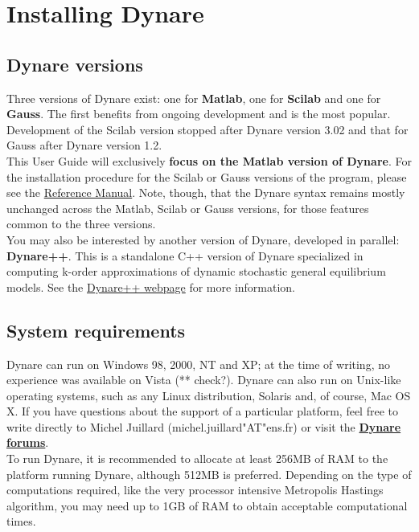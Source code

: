 \chapter{Installing Dynare} \label{ch:inst}

\section{Dynare versions}
Three versions of Dynare exist: one for \textbf{Matlab}, one for \textbf{Scilab} and one for \textbf{Gauss}. The first benefits from ongoing development and is the most popular. Development of the Scilab version stopped after Dynare version 3.02 and that for Gauss after Dynare version 1.2. \\

This User Guide will exclusively \textbf{focus on the Matlab version of Dynare}. For the installation procedure for the Scilab or Gauss versions of the program, please see the \href{http://www.cepremap.cnrs.fr/juillard/mambo/index.php?option=com_content&task=view&id=51&Itemid=84}{Reference Manual}. Note, though, that the Dynare syntax remains mostly unchanged across the Matlab, Scilab or Gauss versions, for those features common to the three versions. \\

You may also be interested by another version of Dynare, developed in parallel: \textbf{Dynare++}. This is a standalone C++ version of Dynare specialized in computing k-order approximations of dynamic stochastic general equilibrium models. See the \href{http://www.cepremap.cnrs.fr/juillard/mambo/index.php?option=com_content&task=view&id=53&Itemid=86}{Dynare++ webpage} for more information. 

\section{System requirements}
Dynare can run on Windows 98, 2000, NT and XP; at the time of writing, no experience was available on Vista (** check?). Dynare can also run on Unix-like operating systems, such as any Linux distribution, Solaris and, of course, Mac OS X. If you have questions about the support of a particular platform, feel free to write directly to Michel Juillard (michel.juillard"AT"ens.fr) or visit the \href{http://www.cepremap.cnrs.fr/juillard/mambo/index.php?option=com_forum&Itemid=95&page=viewforum&f=1}{\textbf{Dynare forums}}. \\

To run Dynare, it is recommended to allocate at least 256MB of RAM to the platform running Dynare, although 512MB is preferred. Depending on the type of computations required, like the very processor intensive Metropolis Hastings algorithm, you may need up to 1GB of RAM to obtain acceptable computational times. \\

